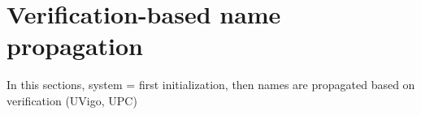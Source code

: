 \section{Verification-based name propagation}
\label{sec:verification}

In this sections, system = first initialization, then names are propagated based on verification (UVigo, UPC)

\endinput
